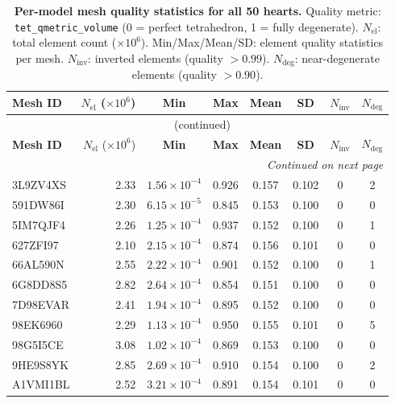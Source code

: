 \iffalse %
\begin{landscape}
\begin{longtable}{lrcccccc}
\caption{
    \textbf{Per-model mesh quality statistics for all 50 hearts.}
    Quality metric: \texttt{tet\_qmetric\_volume} (0 = perfect tetrahedron,
    1 = fully degenerate). $N_{\text{el}}$: total element count
    ($\times 10^6$). Min/Max/Mean/SD: element quality statistics per mesh.
    $N_{\text{inv}}$: inverted elements (quality $> 0.99$).
    $N_{\text{deg}}$: near-degenerate elements (quality $> 0.90$).
} \\
\toprule
\textbf{Mesh ID} &
    $N_{\text{el}}$ ($\times 10^6$) &
    \textbf{Min} &
    \textbf{Max} &
    \textbf{Mean} &
    \textbf{SD} &
    $N_{\text{inv}}$ &
    $N_{\text{deg}}$ \\
\midrule
\endfirsthead
\multicolumn{8}{c}{\tablename\ \thetable{} (continued)} \\
\toprule
\textbf{Mesh ID} &
    $N_{\text{el}}$ ($\times 10^6$) &
    \textbf{Min} &
    \textbf{Max} &
    \textbf{Mean} &
    \textbf{SD} &
    $N_{\text{inv}}$ &
    $N_{\text{deg}}$ \\
\midrule
\endhead
\midrule
\multicolumn{8}{r}{\textit{Continued on next page}} \\
\endfoot
\bottomrule
\endlastfoot
3L9ZV4XS & 2.33 & $1.56\times10^{-4}$ & 0.926 & 0.157 & 0.102 & 0 & 2 \\
591DW86I  & 2.30 & $6.15\times10^{-5}$ & 0.845 & 0.153 & 0.100 & 0 & 0 \\
5IM7QJF4  & 2.26 & $1.25\times10^{-4}$ & 0.937 & 0.152 & 0.100 & 0 & 1 \\
627ZFI97  & 2.10 & $2.15\times10^{-4}$ & 0.874 & 0.156 & 0.101 & 0 & 0 \\
66AL590N  & 2.55 & $2.22\times10^{-4}$ & 0.901 & 0.152 & 0.100 & 0 & 1 \\
6G8DD8S5  & 2.82 & $2.64\times10^{-4}$ & 0.854 & 0.151 & 0.100 & 0 & 0 \\
7D98EVAR  & 2.41 & $1.94\times10^{-4}$ & 0.895 & 0.152 & 0.100 & 0 & 0 \\
98EK6960  & 2.29 & $1.13\times10^{-4}$ & 0.950 & 0.155 & 0.101 & 0 & 5 \\
98G5I5CE  & 3.08 & $1.02\times10^{-4}$ & 0.869 & 0.153 & 0.100 & 0 & 0 \\
9HE9S8YK  & 2.85 & $2.69\times10^{-4}$ & 0.910 & 0.154 & 0.100 & 0 & 2 \\
A1VMI1BL  & 2.52 & $3.21\times10^{-4}$ & 0.891 & 0.154 & 0.101 & 0 & 0 \\

\end{longtable}
\end{landscape}
